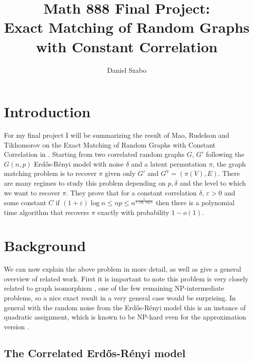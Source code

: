 \documentclass[11pt]{article}
\title{Math 888 Final Project:\\Exact Matching of Random Graphs with Constant Correlation}
\author{Daniel Szabo}
\newcommand{\handout}[5]{
	\noindent
	\begin{center}
		\framebox{
			\vbox{
				\hbox to 5.78in { {\bf MATH888: High-dimensional probability and statistics } \hfill #2 }
				\vspace{4mm}
				\hbox to 5.78in { {\Large \hfill #5  \hfill} }
				\vspace{2mm}
				\hbox to 5.78in { {\em #3 \hfill #4} }
			}
		}
	\end{center}
	\vspace*{4mm}
}
\newcommand{\lecture}[4]{\handout{#1}{#2}{#3}{Scribe: #4}{Lecture #1}}
\begin{document}
	
	\maketitle
	
	\section{Introduction}
	
	For my final project I will be summarizing the result of Mao, Rudelson and Tikhomorov on the Exact Matching of Random Graphs with Constant Correlation in \cite{mao2021exact}. Starting from two correlated random graphs $ G $, $ G' $ following the $ G(n,p) $ Erd\H os-R\' enyi model with noise $ \delta $ and a latent permutation $ \pi $, the graph matching problem is to recover $ \pi $ given only $ G' $ and $ G^\pi=(\pi(V), E) $. There are many regimes to study this problem depending on $ p, \delta $ and the level to which we want to recover $ \pi $. They prove that for a constant correlation $ \delta $, $ \varepsilon> 0 $ and some constant $ C $ if $ (1+\varepsilon) \log n \le np \le n^{\frac{1}{C \log \log n}} $ then there is a polynomial time algorithm that recovers $ \pi $ exactly with probability $ 1-o(1) $.
	
	\section{Background}
	
	We can now explain the above problem in more detail, as well as give a general overview of related work. First it is important to note this problem is very closely related to graph isomorphism \cite{babai2016graph}, one of the few remaining NP-intermediate problems, so a nice exact result in a very general case would be surprising. In general with the random noise from the Erd\H os-R\' enyi model this is an instance of quadratic assignment, which is known to be NP-hard even for the approximation version \cite{Pardalos94thequadratic,burkard1998quadratic}.
	
	\subsection{The Correlated Erd\H os-R\' enyi model}
	
\end{document}
